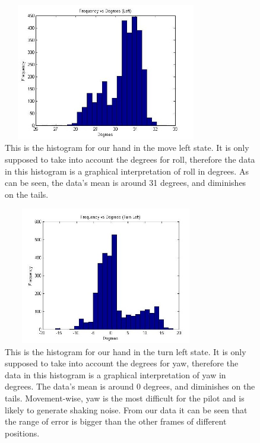 \documentclass[letterpaper,english, 12pt]{article}
\begin{document}
\begin{figure}[t]
	\centering
	\includegraphics[height=6cm,width=90mm]{pics/leftHistogram1.jpg}
	\caption{This is the histogram for our hand in the move left state. It is only supposed to take into account the degrees for roll, therefore the data in this histogram is a graphical interpretation of roll in degrees.  As can be seen, the data's mean is around 31 degrees, and diminishes on the tails.}
\end{figure}

\begin{figure}[t]
	\centering
	\includegraphics[height=6cm,width=90mm]{pics/turnLeftHistogram1.jpg}
	\caption{This is the histogram for our hand in the turn left state. It is only supposed to take into account the degrees for yaw, therefore the data in this histogram is a graphical interpretation of yaw in degrees. The data's mean is around 0 degrees, and diminishes on the tails. Movement-wise, yaw is the most difficult for the pilot and is likely to generate shaking noise.  From our data it can be seen that the range of error is bigger than the other frames of different positions.}
\end{figure}
\end{document}
